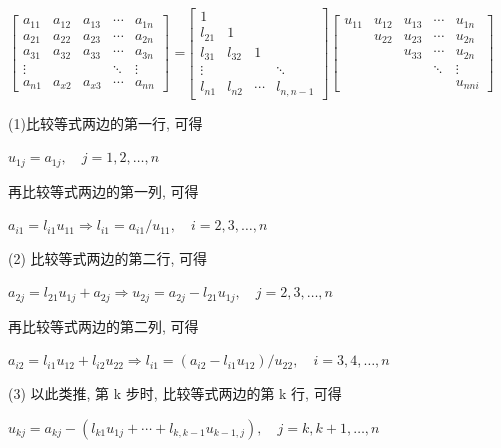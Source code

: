 \documentclass[12pt,a4paper]{article}
\begin{document}
{$\left[\begin{array}{ccccc}{a_{11}} & {a_{12}} & {a_{13}} & {\cdots} & {a_{1 n}} \\ {a_{21}} & {a_{22}} & {a_{23}} & {\cdots} & {a_{2 n}} \\ {a_{31}} & {a_{32}} & {a_{33}} & {\cdots} & {a_{3 n}} \\ {\vdots} & {} & {} & {\ddots} & {\vdots} \\ {a_{n 1}} & {a_{x 2}} & {a_{x 3}} & {\cdots} & {a_{n n}}\end{array}\right]$ =$\left[\begin{array}{cccc}{1} & {} & {} & {} \\ {l_{21}} & {1} & {} & {} \\ {l_{31}} & {l_{32}} & {1} & {} \\ {\vdots} & {} & {} & {\ddots} \\ {l_{n 1}} & {l_{n 2}} & {\cdots} & {l_{n, n-1}}\end{array}\right]$$ \left[\begin{array}{ccccc}{u_{11}} & {u_{12}} & {u_{13}} & {\cdots} & {u_{1 n}} \\ {} & {u_{22}} & {u_{23}} & {\cdots} & {u_{2 n}} \\ {} & {} & {u_{33}} & {\cdots} & {u_{2 n}} \\ {} & {} & {} & {\ddots} & {\vdots} \\ {} & {} & {} & {} & {u_{n n i}}\end{array}\right] $}

\noindent(1)比较等式两边的第一行, 可得

$u_{1 j}=a_{1 j}, \quad j=1,2, \dots, n$

再比较等式两边的第一列, 可得

$a_{i 1}=l_{i 1} u_{11} \Rightarrow l_{i 1}=a_{i 1} / u_{11}, \quad i=2,3, \ldots, n$

\noindent(2) 比较等式两边的第二行, 可得

$a_{2 j}=l_{21} u_{1 j}+a_{2 j} \Rightarrow u_{2 j}=a_{2 j}-l_{21} u_{1 j}, \quad j=2,3, \ldots, n$

再比较等式两边的第二列, 可得

$a_{i 2}=l_{i 1} u_{12}+l_{i 2} u_{22} \Rightarrow l_{i 1}=\left(a_{i 2}-l_{i 1} u_{12}\right) / u_{22}, \quad i=3,4, \ldots, n$

\noindent(3) 以此类推, 第 k 步时, 比较等式两边的第 k 行, 可得

$u_{k j}=a_{k j}-\left(l_{k 1} u_{1 j}+\cdots+l_{k, k-1} u_{k-1, j}\right), \quad j=k, k+1, \ldots, n$
\end{document}
